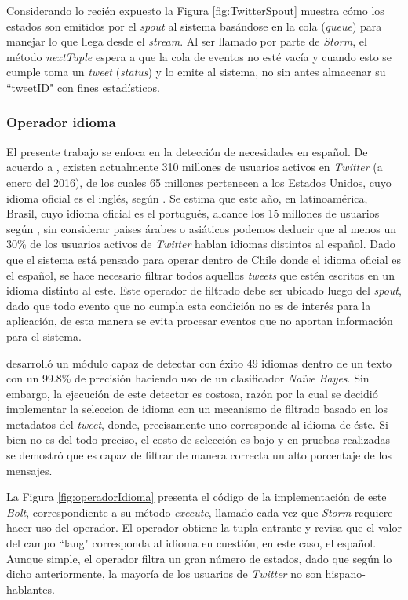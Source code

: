 Considerando lo recién expuesto la Figura \ref{fig:TwitterSpout} muestra cómo los estados son emitidos por el \textit{spout} al sistema basándose en la cola (\textit{queue}) para manejar lo que llega desde el \textit{stream}. Al ser llamado por parte de \textit{Storm}, el método \textit{nextTuple} espera a que la cola de eventos no esté vacía y cuando esto se cumple toma un \textit{tweet} (\textit{status}) y lo emite al sistema, no sin antes almacenar su ``tweetID" con fines estadísticos.

\subsubsection*{Operador idioma}
\label{subsubsec:1op}

El presente trabajo se enfoca en la detección de necesidades en español. De acuerdo a \cite{TwitterActiveUsers}, existen actualmente 310 millones de usuarios activos en \textit{Twitter} (a enero del 2016), de los cuales 65 millones pertenecen a los Estados Unidos, cuyo idioma oficial es el inglés, según \cite{TwitterStats1}. Se estima que este año, en latinoamérica, Brasil, cuyo idioma oficial es el portugués, alcance los 15 millones de usuarios según \cite{TwitterStats2}, sin considerar paises árabes o asiáticos podemos deducir que al menos un 30\% de los usuarios activos de \textit{Twitter} hablan idiomas distintos al español. Dado que el sistema está pensado para operar dentro de Chile donde el idioma oficial es el español, se hace necesario filtrar todos aquellos \textit{tweets} que estén escritos en un idioma distinto al este. Este operador de filtrado debe ser ubicado luego del \textit{spout}, dado que todo evento que no cumpla esta condición no es de interés para la aplicación, de esta manera se evita procesar eventos que no aportan información para el sistema.

\cite{languageDetector} desarrolló un módulo capaz de detectar con éxito 49 idiomas dentro de un texto con un 99.8\% de precisión haciendo uso de un clasificador \textit{Naïve Bayes}. Sin embargo, la ejecución de este detector es costosa, razón por la cual se decidió implementar la seleccion de idioma con un mecanismo de filtrado basado en los metadatos del \textit{tweet}, donde, precisamente uno corresponde al idioma de éste. Si bien no es del todo preciso, el costo de selección es bajo y en pruebas realizadas se demostró que es capaz de filtrar de manera correcta un alto porcentaje de los mensajes.

La Figura \ref{fig:operadorIdioma} presenta el código de la implementación de este \textit{Bolt}, correspondiente a su método \textit{execute}, llamado cada vez que \textit{Storm} requiere hacer uso del operador. El operador obtiene la tupla entrante y revisa que el valor del campo ``lang" corresponda al idioma en cuestión, en este caso, el español. Aunque simple, el operador filtra un gran número de estados, dado que según lo dicho anteriormente, la mayoría de los usuarios de \textit{Twitter} no son hispano-hablantes. 

